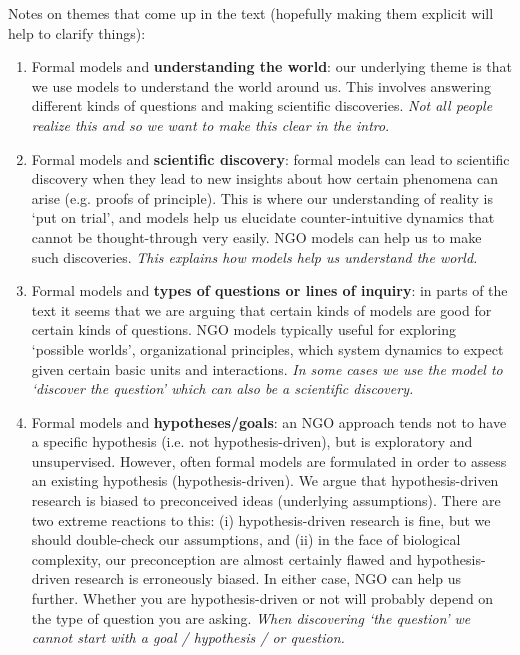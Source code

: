 Notes on themes that come up in the text (hopefully making them explicit will help to clarify things):
\begin{enumerate}
\item Formal models and \textbf{understanding the world}: our underlying theme is that we use models to understand the world around us. This involves answering different kinds of questions and making scientific discoveries. \textit{Not all people realize this and so we want to make this clear in the intro}.
\item Formal models and \textbf{scientific discovery}: formal models can lead to scientific discovery when they lead to new insights about how certain phenomena can arise (e.g. proofs of principle). This is where our understanding of reality is `put on trial', and models help us elucidate counter-intuitive dynamics that cannot be thought-through very easily. NGO models can help us to make such discoveries. \textit{This explains how models help us understand the world.}
\item Formal models and \textbf{types of questions or lines of inquiry}: in parts of the text it seems that we are arguing that certain kinds of models are good for certain kinds of questions. NGO models typically useful for exploring `possible worlds', organizational principles, which system dynamics to expect given certain basic units and interactions. \textit{In some cases we use the model to `discover the question' which can also be a scientific discovery.}
\item Formal models and \textbf{hypotheses/goals}: an NGO approach tends not to have a specific hypothesis (i.e. not hypothesis-driven), but is exploratory and unsupervised. However, often formal models are formulated in order to assess an existing hypothesis (hypothesis-driven). We argue that hypothesis-driven research is biased to preconceived ideas (underlying assumptions). There are two extreme reactions to this: (i) hypothesis-driven research is fine, but we should double-check our assumptions, and (ii) in the face of biological complexity, our preconception are almost certainly flawed and hypothesis-driven research is erroneously biased. In either case, NGO can help us further. Whether you are hypothesis-driven or not will probably depend on the type of question you are asking. \textit{When discovering `the question' we cannot start with a goal / hypothesis / or question.}

\end{enumerate}
